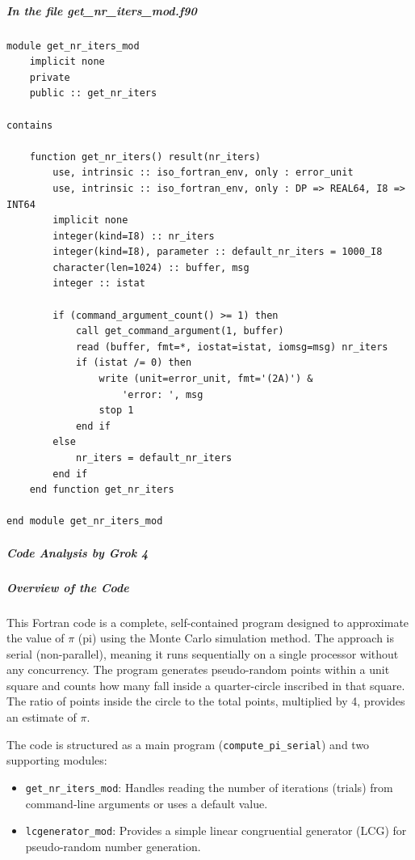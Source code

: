 \subparagraph{In the file get\_nr\_iters\_mod.f90}

\begin{verbatim}
module get_nr_iters_mod
    implicit none
    private
    public :: get_nr_iters

contains

    function get_nr_iters() result(nr_iters)
        use, intrinsic :: iso_fortran_env, only : error_unit
        use, intrinsic :: iso_fortran_env, only : DP => REAL64, I8 => INT64
        implicit none
        integer(kind=I8) :: nr_iters
        integer(kind=I8), parameter :: default_nr_iters = 1000_I8
        character(len=1024) :: buffer, msg
        integer :: istat

        if (command_argument_count() >= 1) then
            call get_command_argument(1, buffer)
            read (buffer, fmt=*, iostat=istat, iomsg=msg) nr_iters
            if (istat /= 0) then
                write (unit=error_unit, fmt='(2A)') &
                    'error: ', msg
                stop 1
            end if
        else
            nr_iters = default_nr_iters
        end if
    end function get_nr_iters

end module get_nr_iters_mod
\end{verbatim}

\subparagraph{Code Analysis by Grok 4}

\subparagraph{Overview of the Code}

This Fortran code is a complete, self-contained program designed to approximate the value of $\pi$ (pi) using the Monte Carlo simulation method. The approach is serial (non-parallel), meaning it runs sequentially on a single processor without any concurrency. The program generates pseudo-random points within a unit square and counts how many fall inside a quarter-circle inscribed in that square. The ratio of points inside the circle to the total points, multiplied by 4, provides an estimate of $\pi$.

The code is structured as a main program (\texttt{compute\_pi\_serial}) and two supporting modules:

\begin{itemize}
\item \texttt{get\_nr\_iters\_mod}: Handles reading the number of iterations (trials) from command-line arguments or uses a default value.
\item \texttt{lcgenerator\_mod}: Provides a simple linear congruential generator (LCG) for pseudo-random number generation.
\end{itemize}

